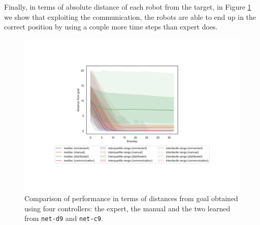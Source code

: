 Finally, in terms of absolute distance of each robot from the target, in Figure 
\ref{fig:net-c9distance} we show that exploiting the communication, the robots 
are able to end up in the correct position by using a couple more time steps than 
expert does. 
\begin{figure}[H]
	\centering
	\includegraphics[width=.65\textwidth]{contents/images/net-c9/distances-from-goal-compressed-communication}%
	\caption[Evaluation of \texttt{net-c9} distances from goal.]{Comparison of 
		performance in terms of distances from goal obtained using four controllers: 
		the expert, the manual and the two learned from \texttt{net-d9} and 
		\texttt{net-c9}.}
	\label{fig:net-c9distance}
\end{figure}

